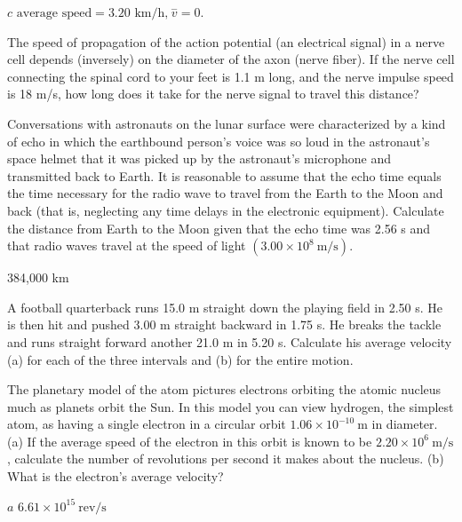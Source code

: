 \documentclass[
]{book}
\begin{document}
\(c\)
\({{\text{average\ speed} = \text{3.20\ km/h,}\ \overset{-}{v}} = 0.}{}\)

\hypertarget{fs-id1644060}{}
\leavevmode{}%
The speed of propagation of the action potential (an electrical signal)
in a nerve cell depends (inversely) on the diameter of the axon (nerve
fiber). If the nerve cell connecting the spinal cord to your feet is 1.1
m long, and the nerve impulse speed is 18 m/s, how long does it take for
the nerve signal to travel this distance?

\hypertarget{fs-id1638875}{}
\leavevmode{}%
Conversations with astronauts on the lunar surface were characterized by
a kind of echo in which the earthbound person's voice was so loud in
the astronaut's space helmet that it was picked up by the astronaut's
microphone and transmitted back to Earth. It is reasonable to assume
that the echo time equals the time necessary for the radio wave to
travel from the Earth to the Moon and back (that is, neglecting any time
delays in the electronic equipment). Calculate the distance from Earth
to the Moon given that the echo time was 2.56 s and that radio waves
travel at the speed of light
\((3\text{.}{\text{00} \times \text{10}^{8}\ }\text{m/s})\).

\leavevmode{}%
384,000 km

\hypertarget{fs-id2577314}{}
\leavevmode{}%
A football quarterback runs 15.0 m straight down the playing field in
2.50 s. He is then hit and pushed 3.00 m straight backward in 1.75 s. He
breaks the tackle and runs straight forward another 21.0 m in 5.20 s.
Calculate his average velocity (a) for each of the three intervals and
(b) for the entire motion.

\hypertarget{fs-id4047255}{}
\leavevmode{}%
The planetary model of the atom pictures electrons orbiting the atomic
nucleus much as planets orbit the Sun. In this model you can view
hydrogen, the simplest atom, as having a single electron in a circular
orbit \(1\text{.}\text{06} \times \text{10}^{- \text{10}}\ \text{m}\) in
diameter. (a) If the average speed of the electron in this orbit is
known to be \(2\text{.}{\text{20} \times \text{10}^{6}}\ \text{m/s}\),
calculate the number of revolutions per second it makes about the
nucleus. (b) What is the electron's average velocity?

\leavevmode{}%
\(a\)
\({6\text{.}{\text{61} \times \text{10}^{\text{15}}}\ \text{rev/s}}{}\)
\end{document}
